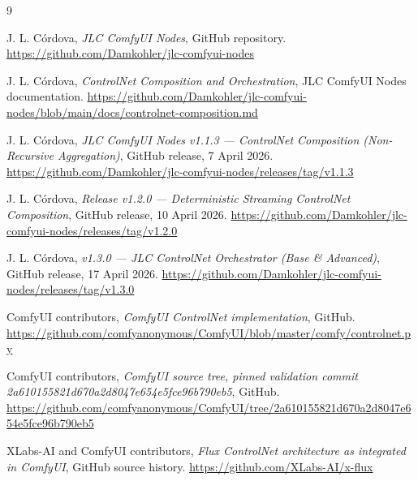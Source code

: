 \documentclass[11pt]{article}
\begin{document}
\begin{thebibliography}{9}

J. L. C\'ordova,
\emph{JLC ComfyUI Nodes},
GitHub repository.
\url{https://github.com/Damkohler/jlc-comfyui-nodes}

J. L. C\'ordova,
\emph{ControlNet Composition and Orchestration},
JLC ComfyUI Nodes documentation.
\url{https://github.com/Damkohler/jlc-comfyui-nodes/blob/main/docs/controlnet-composition.md}

J. L. C\'ordova,
\emph{JLC ComfyUI Nodes v1.1.3 --- ControlNet Composition (Non-Recursive Aggregation)},
GitHub release, 7 April 2026.
\url{https://github.com/Damkohler/jlc-comfyui-nodes/releases/tag/v1.1.3}

J. L. C\'ordova,
\emph{Release v1.2.0 --- Deterministic Streaming ControlNet Composition},
GitHub release, 10 April 2026.
\url{https://github.com/Damkohler/jlc-comfyui-nodes/releases/tag/v1.2.0}

J. L. C\'ordova,
\emph{v1.3.0 --- JLC ControlNet Orchestrator (Base \& Advanced)},
GitHub release, 17 April 2026.
\url{https://github.com/Damkohler/jlc-comfyui-nodes/releases/tag/v1.3.0}

ComfyUI contributors,
\emph{ComfyUI ControlNet implementation},
GitHub.
\url{https://github.com/comfyanonymous/ComfyUI/blob/master/comfy/controlnet.py}

ComfyUI contributors,
\emph{ComfyUI source tree, pinned validation commit 2a610155821d670a2d8047e654e5fce96b790eb5},
GitHub.
\url{https://github.com/comfyanonymous/ComfyUI/tree/2a610155821d670a2d8047e654e5fce96b790eb5}

XLabs-AI and ComfyUI contributors,
\emph{Flux ControlNet architecture as integrated in ComfyUI},
GitHub source history.
\url{https://github.com/XLabs-AI/x-flux}

\end{thebibliography}
\end{document}
